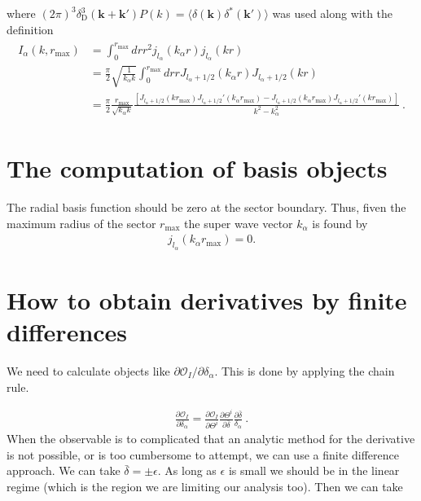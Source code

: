 \documentclass[11pt, oneside]{article}   	%
\newcommand{\jl}[1]{j_{l_#1}}
\newcommand{\obs}{\mathcal{O}}
\begin{document}
where $(2 \pi)^3 \delta^3_\text{D}( \mathbf{k} + \mathbf{k}') P(k) =  \langle \delta(\mathbf{k}) \delta^*(\mathbf{k}') \rangle$ was used along with the definition 
\begin{align} 
\begin{split} 
I_\alpha(k,  r_\text{max}) & =  \int_0^{r_\text{max}}dr r^2 \jl{\alpha}(k_\alpha r) \jl{\alpha}( k r) \\
& = \frac{\pi}{2} \sqrt{ \frac{1}{k _ \alpha k}} \int_0^{r_\text{max}}dr r J_{l_\alpha+ 1/2}(k_\alpha r)  J_{l_\alpha+ 1/2}( k r) \\
& = \frac{\pi}{2} \frac{ r_\text{max}}{ \sqrt{ k _ \alpha k}}\frac{\left[J_{l_\alpha+ 1/2}( k  r_\text{max})J_{l_\alpha+ 1/2}'(k_\alpha  r_\text{max}) - J_{l_\alpha+ 1/2}(k_\alpha  r_\text{max})J_{l_\alpha+ 1/2}'(k  r_\text{max})\right]}{k^2 - k_\alpha^2}~.
\end{split} 
\end{align}

\section{The computation of basis objects}
The radial basis function should be zero at the sector boundary. Thus, fiven the maximum radius of the sector $r_\text{max}$ the super wave vector $k_\alpha$ is found by 
\begin{align}
 j_{l_\alpha}(k_\alpha r_\text{max})=0.
 \end{align}

\section{How to obtain derivatives by finite differences}
We need to calculate objects like $\partial \obs_I/ \partial \delta_\alpha$. This is done by applying the chain rule. 

\begin{align} 
\frac{\partial \obs_I}{ \partial \delta_\alpha} = \frac{\partial \obs_I}{ \partial \Theta^i} \frac{\partial \Theta^i}{\partial \bar{\delta} } \frac{\partial \bar{\delta}}{\delta_\alpha} ~. 
\end{align}
When the observable is to complicated that an analytic method for the derivative is not possible, or is too cumbersome to attempt, we can use a finite difference approach. We can take $\bar{\delta}=\pm \epsilon$. As long as $\epsilon$ is small we should be in the linear regime (which is the region we are limiting our analysis too). Then we can take 
\end{document}
